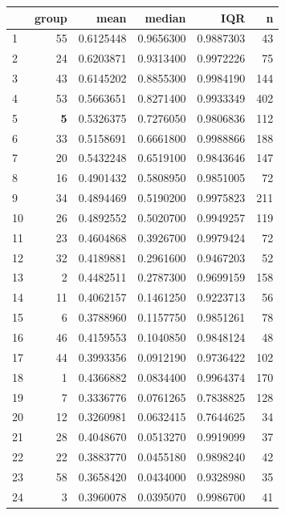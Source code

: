 \begin{table}[ht]
\centering
\setlength{\extrarowheight}{2pt}
\begin{tabular}{lrrrrr}
  \hline
 & group & mean & median & IQR & n \\ 
  \hline
1 & 55 & 0.6125448 & 0.9656300 & 0.9887303 & 43 \\ 
  2 & 24 & 0.6203871 & 0.9313400 & 0.9972226 & 75 \\ 
  3 & 43 & 0.6145202 & 0.8855300 & 0.9984190 & 144 \\ 
  4 & 53 & 0.5663651 & 0.8271400 & 0.9933349 & 402 \\ 
  5 & \textbf{5} & 0.5326375 & 0.7276050 & 0.9806836 & 112 \\ 
  6 & 33 & 0.5158691 & 0.6661800 & 0.9988866 & 188 \\ 
  7 & 20 & 0.5432248 & 0.6519100 & 0.9843646 & 147 \\ 
  8 & 16 & 0.4901432 & 0.5808950 & 0.9851005 & 72 \\ 
  9 & 34 & 0.4894469 & 0.5190200 & 0.9975823 & 211 \\ 
  10 & 26 & 0.4892552 & 0.5020700 & 0.9949257 & 119 \\ 
  11 & 23 & 0.4604868 & 0.3926700 & 0.9979424 & 72 \\ 
  12 & 32 & 0.4189881 & 0.2961600 & 0.9467203 & 52 \\ 
  13 & 2 & 0.4482511 & 0.2787300 & 0.9699159 & 158 \\ 
  14 & 11 & 0.4062157 & 0.1461250 & 0.9223713 & 56 \\ 
  15 & 6 & 0.3788960 & 0.1157750 & 0.9851261 & 78 \\ 
  16 & 46 & 0.4159553 & 0.1040850 & 0.9848124 & 48 \\ 
  17 & 44 & 0.3993356 & 0.0912190 & 0.9736422 & 102 \\ 
  18 & 1 & 0.4366882 & 0.0834400 & 0.9964374 & 170 \\ 
  19 & 7 & 0.3336776 & 0.0761265 & 0.7838825 & 128 \\ 
  20 & 12 & 0.3260981 & 0.0632415 & 0.7644625 & 34 \\ 
  21 & 28 & 0.4048670 & 0.0513270 & 0.9919099 & 37 \\ 
  22 & 22 & 0.3883770 & 0.0455180 & 0.9898240 & 42 \\ 
  23 & 58 & 0.3658420 & 0.0434000 & 0.9328980 & 35 \\ 
  24 & 3 & 0.3960078 & 0.0395070 & 0.9986700 & 41 \\ 

\end{tabular}
\end{table}
